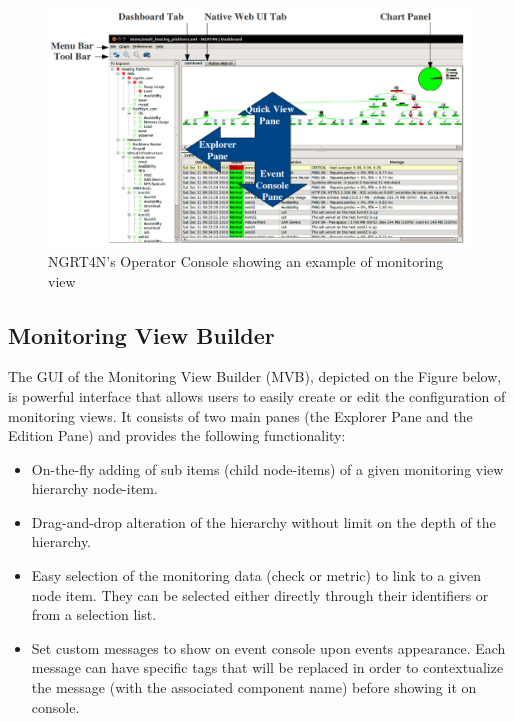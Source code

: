 \documentclass[a4paper,9pt]{article}
\begin{document}
\begin{figure}
\centering
\includegraphics[width=18cm]{images/annotated-dashboard.png}
\caption{NGRT4N's Operator Console showing an example of monitoring view}
\end{figure}

\subsection{Monitoring View Builder}
The GUI of the Monitoring View Builder (MVB), depicted on the Figure below, is powerful interface that allows users to easily create or edit the configuration of monitoring views. It consists of two main panes (the Explorer Pane and the Edition Pane) and provides the following functionality: 
\begin{itemize}
        \item On-the-fly adding of sub items (child node-items) of a given monitoring view hierarchy node-item.
        \item Drag-and-drop alteration of the hierarchy without limit on the depth of the hierarchy.
        \item Easy selection of the monitoring data (check or metric) to link to a given node item. They can be selected either directly through their identifiers or from a selection list.
        \item Set custom messages to show on event console upon events appearance. Each message can have specific tags that will be replaced in order to contextualize the message (with the associated component name) before showing it on console.   
\end{itemize}
\end{document}
